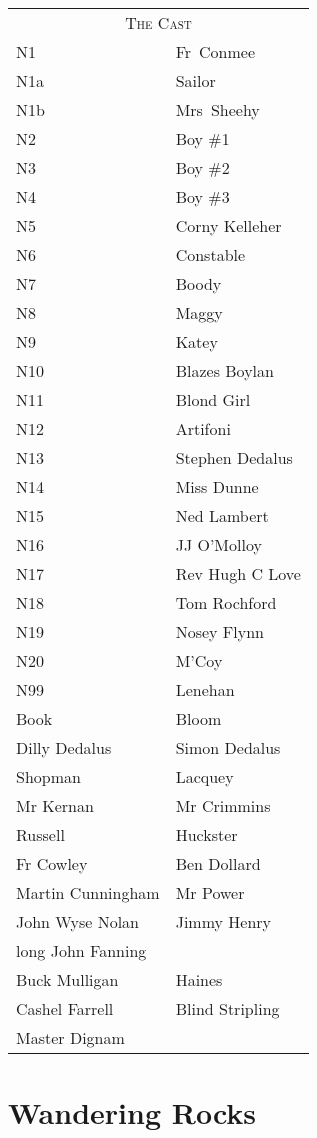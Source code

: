 \begin{tabular}{lp{10cm}}
    \multicolumn{2}{c}{\Large \textsc{The Cast}} \\
N1              & Fr~Conmee \\
N1a             & Sailor \\
N1b             & Mrs~Sheehy \\
N2              & Boy \#1 \\
N3              & Boy \#2 \\
N4              & Boy \#3 \\
N5              & Corny Kelleher \\
N6              & Constable \\
N7              & Boody \\
N8              & Maggy \\
N9              & Katey \\
N10             & Blazes Boylan \\
N11             & Blond Girl \\
N12             & Artifoni \\
N13             & Stephen Dedalus \\
N14             & Miss Dunne \\
N15             & Ned Lambert \\
N16             & JJ O'Molloy \\
N17             & Rev Hugh C Love \\
N18             & Tom Rochford \\
N19             & Nosey Flynn \\
N20             & M'Coy \\
N99             & Lenehan \\
Book            & Bloom \\
Dilly Dedalus   & Simon Dedalus \\
Shopman         & Lacquey \\
Mr Kernan       & Mr Crimmins \\
Russell         & Huckster \\
Fr Cowley       & Ben Dollard \\
Martin Cunningham & Mr Power \\
John Wyse Nolan & Jimmy Henry \\
long John Fanning \\
Buck Mulligan   & Haines \\
Cashel Farrell  & Blind Stripling \\
Master Dignam \\
\end{tabular}

\thispagestyle{empty}
\newpage


\setcounter{page}{1}

\section*{Wandering Rocks}




